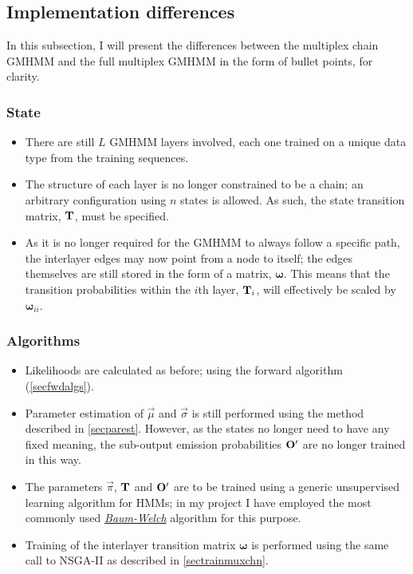 \documentclass[12pt,a4paper,twoside,openright]{report}
\newcommand\bomega{\boldsymbol\omega}
\begin{document}
\subsection{Implementation differences}

In this subsection, I will present the differences between the multiplex chain GMHMM and the full multiplex GMHMM in the form of bullet points, for clarity.

\subsubsection{State} 

\begin{itemize}
	\item There are still $L$ GMHMM layers involved, each one trained on a unique data type from the training sequences.
	\item The structure of each layer is no longer constrained to be a chain; an arbitrary configuration using $n$ states is allowed. As such, the state transition matrix, $\bf T$, must be specified.
	\item As it is no longer required for the GMHMM to always follow a specific path, the interlayer edges may now point from a node to itself; the edges themselves are still stored in the form of a matrix, $\bomega$. This means that the transition probabilities within the $i$th layer, ${\bf T}_i$, will effectively be scaled by $\bomega_{ii}$.
\end{itemize}

\subsubsection{Algorithms}
\begin{itemize}
	\item Likelihoods are calculated as before; using the forward algorithm (\cref{secfwdalgs}).
	\item Parameter estimation of $\vec{\mu}$ and $\vec{\sigma}$ is still performed using the method described in \cref{secparest}. However, as the states no longer need to have any fixed meaning, the sub-output emission probabilities $\bf O'$ are no longer trained in this way.
	\item The parameters $\vec{\pi}$, $\bf T$ and $\bf O'$ are to be trained using a generic unsupervised learning algorithm for HMMs; in my project I have employed the most commonly used \underline{\emph{Baum-Welch}} algorithm for this purpose.
	\item Training of the interlayer transition matrix $\bomega$ is performed using the same call to NSGA-II as described in \cref{sectrainmuxchn}.
\end{itemize}
\end{document}
